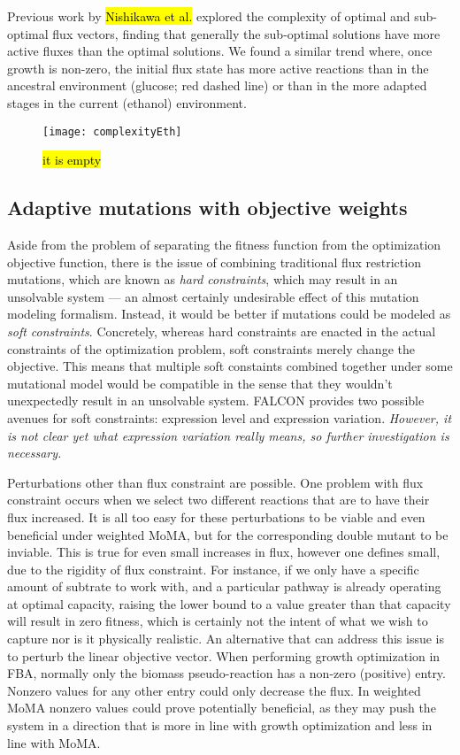 Previous work by \hl{Nishikawa et al.} explored the complexity of optimal
and sub-optimal flux vectors, finding that generally the sub-optimal
solutions have more active fluxes than the optimal solutions. We found
a similar trend where, once growth is non-zero, the initial flux state
has more active reactions than in the ancestral environment (glucose;
red dashed line) or than in the more adapted stages in the current
(ethanol) environment.


\begin{figure}
\centering
  \texttt{[image: complexityEth]}
  \caption{\hl{it is empty}} 
  \label{fig:complexityEth}
\end{figure}


\subsection{Adaptive mutations with objective weights}

Aside from the problem of separating the fitness function from the 
optimization objective function, there is the issue of combining traditional flux
restriction mutations, which are known as \emph{hard constraints}, which may
result in an unsolvable system --- an almost certainly undesirable
effect of this mutation modeling formalism. Instead, it would be
better if mutations could be modeled as \emph{soft
  constraints}. Concretely, whereas hard constraints are enacted in
the actual constraints of the optimization problem, soft constraints
merely change the objective. This means that multiple soft constaints
combined together under some mutational model would be compatible in
the sense that they wouldn't unexpectedly result in an unsolvable
system. FALCON provides two possible avenues for soft constraints:
expression level and expression variation. \emph{However, it is not
  clear yet what expression variation really means, so further
  investigation is necessary.}


Perturbations other than flux constraint are possible. One problem
with flux constraint occurs when we select two different reactions
that are to have their flux increased. It is all too easy for these
perturbations to be viable and even beneficial under weighted MoMA,
but for the corresponding double mutant to be inviable. This is true
for even small increases in flux, however one defines small, due to
the rigidity of flux constraint. For instance, if we only have a
specific amount of subtrate to work with, and a particular pathway is
already operating at optimal capacity, raising the lower bound to a
value greater than that capacity will result in zero fitness, which is
certainly not the intent of what we wish to capture nor is it
physically realistic. An alternative that can address this issue is to
perturb the linear objective vector. When performing growth
optimization in FBA, normally only the biomass pseudo-reaction has a
non-zero (positive) entry. Nonzero values for any other entry could
only decrease the flux. In weighted MoMA nonzero values could prove
potentially beneficial, as they may push the system in a direction
that is more in line with growth optimization and less in line with
MoMA.

